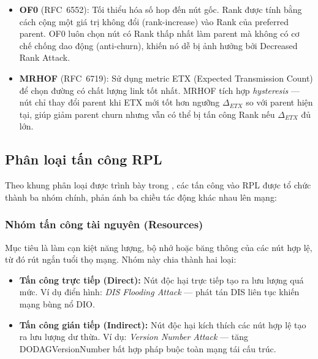 \begin{itemize}
    \item \textbf{OF0} (RFC~6552): Tối thiểu hóa số hop đến nút gốc.
          Rank được tính bằng cách cộng một giá trị không đổi
          (rank-increase) vào Rank của preferred parent. OF0 luôn chọn
          nút có Rank thấp nhất làm parent mà không có cơ chế chống
          dao động (anti-churn), khiến nó dễ bị ảnh hưởng bởi
          Decreased Rank Attack.
    \item \textbf{MRHOF} (RFC~6719): Sử dụng metric ETX (Expected
          Transmission Count) để chọn đường có chất lượng link tốt nhất.
          MRHOF tích hợp \textit{hysteresis} --- nút chỉ thay đổi parent
          khi ETX mới tốt hơn ngưỡng $\Delta_{ETX}$ so với parent hiện
          tại, giúp giảm parent churn nhưng vẫn có thể bị tấn công Rank
          nếu $\Delta_{ETX}$ đủ lớn.
\end{itemize}

\subsection{Phân loại tấn công RPL}
\label{subsec:attack_taxonomy}

Theo khung phân loại được trình bày trong \cite{overview_rpl_framework},
các tấn công vào RPL được tổ chức thành ba nhóm chính, phản ánh ba chiều
tác động khác nhau lên mạng:

\subsubsection{Nhóm tấn công tài nguyên (Resources)}

Mục tiêu là làm cạn kiệt năng lượng, bộ nhớ hoặc băng thông của các nút
hợp lệ, từ đó rút ngắn tuổi thọ mạng. Nhóm này chia thành hai loại:

\begin{itemize}
    \item \textbf{Tấn công trực tiếp (Direct):} Nút độc hại trực tiếp
          tạo ra lưu lượng quá mức. Ví dụ điển hình: \textit{DIS Flooding
          Attack} --- phát tán DIS liên tục khiến mạng bùng nổ DIO.
    \item \textbf{Tấn công gián tiếp (Indirect):} Nút độc hại kích thích
          các nút hợp lệ tạo ra lưu lượng dư thừa. Ví dụ:
          \textit{Version Number Attack} --- tăng DODAGVersionNumber bất
          hợp pháp buộc toàn mạng tái cấu trúc.
\end{itemize}

